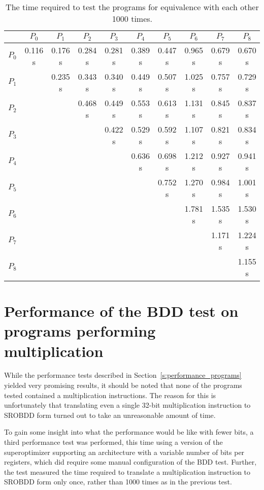 \documentclass[a4paper,11pt]{kth-mag}
\begin{document}
\begin{table}
\centering
\begin{tabular}{l|*{9}{c}}
      & $P_0$   & $P_1$   & $P_2$   & $P_3$   & $P_4$   & $P_5$   & $P_6$   & $P_7$   & $P_8$   \\
\hline
$P_0$ & 0.116 s & 0.176 s & 0.284 s & 0.281 s & 0.389 s & 0.447 s & 0.965 s & 0.679 s & 0.670 s \\
$P_1$ &         & 0.235 s & 0.343 s & 0.340 s & 0.449 s & 0.507 s & 1.025 s & 0.757 s & 0.729 s \\
$P_2$ &         &         & 0.468 s & 0.449 s & 0.553 s & 0.613 s & 1.131 s & 0.845 s & 0.837 s \\
$P_3$ &         &         &         & 0.422 s & 0.529 s & 0.592 s & 1.107 s & 0.821 s & 0.834 s \\
$P_4$ &         &         &         &         & 0.636 s & 0.698 s & 1.212 s & 0.927 s & 0.941 s \\
$P_5$ &         &         &         &         &         & 0.752 s & 1.270 s & 0.984 s & 1.001 s \\
$P_6$ &         &         &         &         &         &         & 1.781 s & 1.535 s & 1.530 s \\
$P_7$ &         &         &         &         &         &         &         & 1.171 s & 1.224 s \\
$P_8$ &         &         &         &         &         &         &         &         & 1.155 s \\
\end{tabular}
\caption{The time required to test the programs for equivalence with each other 1000 times.}
\label{tab:performance2}
\end{table}


\section{Performance of the BDD test on programs performing multiplication}
\label{s:performance_mul}

While the performance tests described in Section~\ref{s:performance_programs} yielded very promising results, it should be noted that none of the programs tested contained a multiplication instructions.
The reason for this is unfortunately that translating even a single 32-bit multiplication instruction to SROBDD form turned out to take an unreasonable amount of time.

To gain some insight into what the performance would be like with fewer bits, a third performance test was performed, this time using a version of the superoptimizer supporting an architecture with a variable number of bits per registers, which did require some manual configuration of the BDD test.
Further, the test measured the time required to translate a multiplication instruction to SROBDD form only once, rather than 1000 times as in the previous test.
\end{document}
